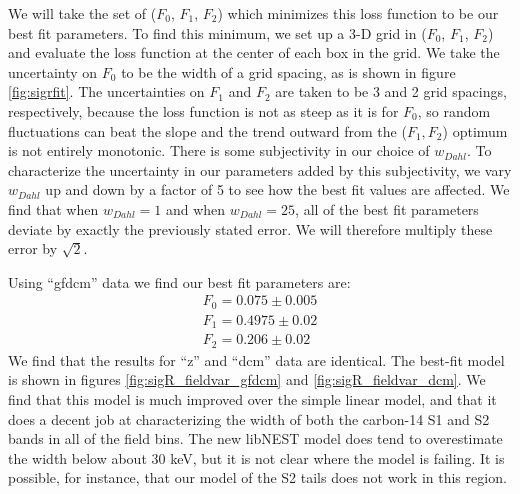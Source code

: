 We will take the set of ($F_0$, $F_1$, $F_2$) which minimizes this loss function to be our best fit parameters. To find this minimum, we set up a 3-D grid in ($F_0$, $F_1$, $F_2$) and evaluate the loss function at the center of each box in the grid. We take the uncertainty on $F_0$ to be the width of a grid spacing, as is shown in figure \ref{fig:sigrfit}. The uncertainties on $F_1$ and $F_2$ are taken to be 3 and 2 grid spacings, respectively, because the loss function is not as steep as it is for $F_0$, so random fluctuations can beat the slope and the trend outward from the ($F_1,F_2$) optimum is not entirely monotonic. There is some subjectivity in our choice of $w_{Dahl}$. To characterize the uncertainty in our parameters added by this subjectivity, we vary $w_{Dahl}$ up and down by a factor of 5 to see how the best fit values are affected. We find that when $w_{Dahl}=1$ and when $w_{Dahl}=25$, all of the best fit parameters deviate by exactly the previously stated error. We will therefore multiply these error by $\sqrt{2}$.

Using ``gfdcm'' data we find our best fit parameters are:
\begin{equation}\label{eq:sigrbestfit}
\begin{split}
F_0=0.075 \pm 0.005\\
F_1=0.4975 \pm 0.02\\
F_2=0.206 \pm 0.02
\end{split}
\end{equation}
We find that the results for ``z'' and ``dcm'' data are identical. The best-fit model is shown in figures \ref{fig:sigR_fieldvar_gfdcm} and \ref{fig:sigR_fieldvar_dcm}. We find that this model is much improved over the simple linear model, and that it does a decent job at characterizing the width of both the carbon-14 S1 and S2 bands in all of the field bins. The new libNEST model does tend to overestimate the width below about 30 keV, but it is not clear where the model is failing. It is possible, for instance, that our model of the S2 tails does not work in this region.

